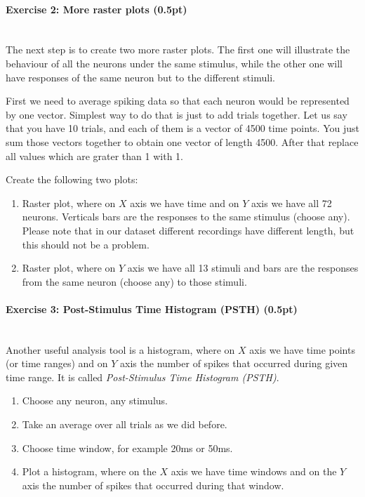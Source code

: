 \documentclass[a4paper,11pt]{article}
\newenvironment{exercise}[3]{\paragraph{Exercise #1: #2 (#3pt)}\ \\}{
\medskip}
\begin{document}
\begin{exercise}{2}{More raster plots}{0.5}
The next step is to create two more raster plots. The first one will illustrate the behaviour of all the neurons under the same stimulus, while the other one will have responses of the same neuron but to the different stimuli.

First we need to average spiking data so that each neuron would be represented by one vector. Simplest way to do that is just to add trials together. Let us say that you have 10 trials, and each of them is a vector of 4500 time points. You just sum those vectors together to obtain one vector of length 4500. After that replace all values which are grater than 1 with 1.

Create the following two plots:
\begin{enumerate}
	\item Raster plot, where on $X$ axis we have time and on $Y$ axis we have all 72 neurons. Verticals bars are the responses to the same stimulus (choose any). Please note that in our dataset different recordings have different length, but this should not be a problem.
	\item Raster plot, where on $Y$ axis we have all 13 stimuli and bars are the responses from the same neuron (choose any) to those stimuli.
\end{enumerate}
\end{exercise}


\begin{exercise}{3}{Post-Stimulus Time Histogram (PSTH)}{0.5}
Another useful analysis tool is a histogram, where on $X$ axis we have time points (or time ranges) and on $Y$ axis the number of spikes that occurred during given time range. It is called \emph{Post-Stimulus Time Histogram (PSTH)}.
\begin{enumerate}
	\item Choose any neuron, any stimulus.
	\item Take an average over all trials as we did before.
	\item Choose time window, for example 20ms or 50ms.
	\item Plot a histogram, where on the $X$ axis we have time windows and on the $Y$ axis the number of spikes that occurred during that window.
\end{enumerate}
\end{exercise}
\end{document}

